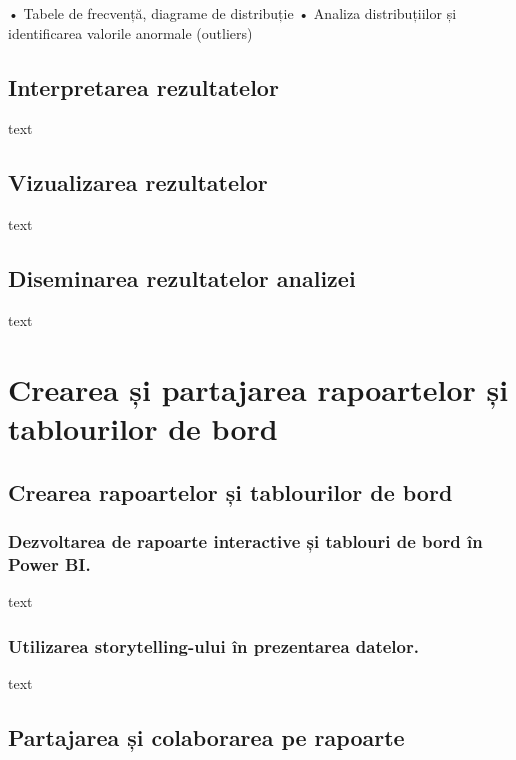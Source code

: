 \documentclass[
  11pt,
  b5paper,
  nottoc]{book}
\begin{document}
• Tabele de frecvență, diagrame de distribuție • Analiza distribuțiilor
și identificarea valorile anormale (outliers)

\section{Interpretarea rezultatelor}\label{interpretarea-rezultatelor}

text

\section{Vizualizarea rezultatelor}\label{vizualizarea-rezultatelor}

text

\section{Diseminarea rezultatelor
analizei}\label{diseminarea-rezultatelor-analizei}

text


\chapter{Crearea și partajarea rapoartelor și tablourilor de
bord}\label{cap8}

\section{Crearea rapoartelor și tablourilor de
bord}\label{crearea-rapoartelor-ux219i-tablourilor-de-bord}

\subsection{Dezvoltarea de rapoarte interactive și tablouri de bord în
Power
BI.}\label{dezvoltarea-de-rapoarte-interactive-ux219i-tablouri-de-bord-uxeen-power-bi.}

text

\subsection{Utilizarea storytelling-ului în prezentarea
datelor.}\label{utilizarea-storytelling-ului-uxeen-prezentarea-datelor.}

text

\section{Partajarea și colaborarea pe
rapoarte}\label{partajarea-ux219i-colaborarea-pe-rapoarte}
\end{document}
